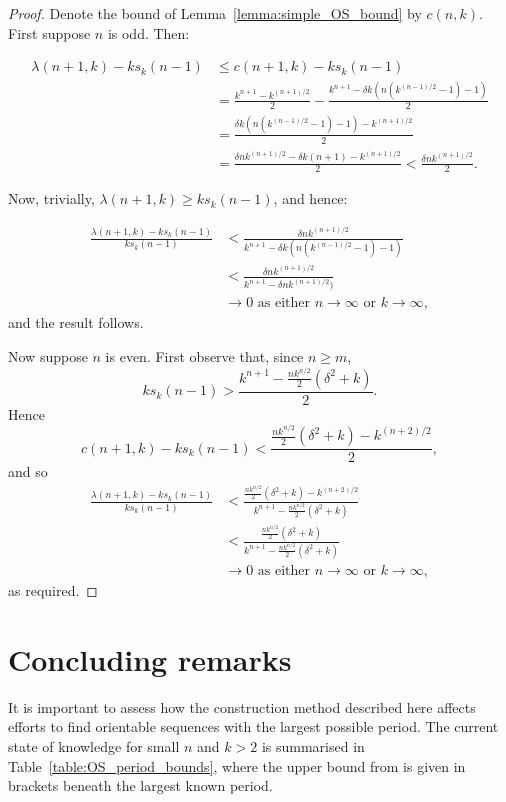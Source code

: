 \documentclass[a4paper,11pt]{article}
\theoremstyle{plain}
\theoremstyle{definition}
\theoremstyle{remark}
\begin{document}
\begin{proof}
Denote the bound of Lemma~\ref{lemma:simple_OS_bound} by $c(n,k)$.  First suppose $n$ is odd. Then:

\begin{align*}
\lambda(n+1,k)-ks_k(n-1) & \leq c(n+1,k)-ks_k(n-1) \\
& = \frac{k^{n+1}-k^{(n+1)/2}}{2} - \frac{k^{n+1}-\delta k(n(k^{(n-1)/2}-1)-1)}{2} \\
& = \frac{\delta k(n(k^{(n-1)/2}-1)-1)-k^{(n+1)/2}}{2} \\
& = \frac{\delta nk^{(n+1)/2}-\delta k(n+1)-k^{(n+1)/2}}{2} < \frac{\delta nk^{(n+1)/2}}{2}.
\end{align*}

Now, trivially, $\lambda(n+1,k)\geq ks_k(n-1)$, and hence:

\begin{align*}
\frac{\lambda(n+1,k)-ks_k(n-1)}{ks_k(n-1)} & < \frac{\delta nk^{(n+1)/2}}{k^{n+1}-\delta k(n(k^{(n-1)/2}-1)-1)} \\
& < \frac{\delta nk^{(n+1)/2}}{k^{n+1}-\delta nk^{(n+1)/2})} \\
& \rightarrow 0 \text{~as either~} n\rightarrow\infty \text{~or~} k\rightarrow\infty,
\end{align*}
and the result follows.

Now suppose $n$ is even. First observe that, since $n\geq m$,
\[ ks_k(n-1) > \frac{k^{n+1} - \frac{nk^{n/2}}{2}(\delta^2+k)}{2}. \]
Hence
\[ c(n+1,k)-ks_k(n-1) < \frac{\frac{nk^{n/2}}{2}(\delta^2+k) - k^{(n+2)/2}}{2}, \]
and so
\begin{align*}
\frac{\lambda(n+1,k)-ks_k(n-1)}{ks_k(n-1)} & <
\frac{\frac{nk^{n/2}}{2}(\delta^2+k) - k^{(n+2)/2}}{k^{n+1} - \frac{nk^{n/2}}{2}(\delta^2+k)}\\
& < \frac{\frac{nk^{n/2}}{2}(\delta^2+k)}{k^{n+1} - \frac{nk^{n/2}}{2}(\delta^2+k)}\\
& \rightarrow 0 \text{~as either~} n\rightarrow\infty \text{~or~} k\rightarrow\infty,
\end{align*}
as required.
\end{proof}



\section{Concluding remarks}  \label{section:conclusions}

It is important to assess how the construction method described here affects efforts to find
orientable sequences with the largest possible period.  The current state of knowledge for small
$n$ and $k>2$ is summarised in Table~\ref{table:OS_period_bounds}, where the upper bound from
\cite[Theorem 2.13]{Mitchell26} is given in brackets beneath the largest known period.
\end{document}
